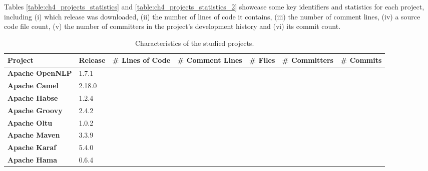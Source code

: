 Tables \ref{table:ch4_projects_statistics} and \ref{table:ch4_projects_statistics_2} showcase some key identifiers and statistics for each project, including (i) which release was downloaded, (ii) the number of lines of code it contains, (iii) the number of comment lines, (iv) a source code file count, (v) the number of committers in the project's development history and (vi) its commit count.

\begin{landscape}


\begin{table}[htbp]
	\small
	\centering
	\caption{Characteristics of the studied projects.}
	\begin{adjustbox}{width=1.3\textwidth}


		\begin{tabular}{l|l|l|c|c|c|c}
			\hline
			\textbf{Project}           & \textbf{Release} & \textbf{\# Lines of Code} & \textbf{\# Comment Lines} & \textbf{\# Files} & \textbf{\# Committers} & \textbf{\# Commits} \\ \hline
			\textbf{Apache OpenNLP}    & 1.7.1            &                           &                           &                   &                        &  \\ \hline
			\textbf{Apache Camel}      & 2.18.0           &                           &                           &                   &                        &  \\ \hline
			\textbf{Apache Habse}      & ‎1.2.4           &                           &                           &                   &                        &  \\ \hline
			\textbf{Apache Groovy}     & 2.4.2            &                           &                           &                   &                        &  \\ \hline
			\textbf{Apache Oltu}       & 1.0.2            &                           &                           &                   &                        &  \\ \hline
			\textbf{Apache Maven}      & 3.3.9            &                           &                           &                   &                        &  \\ \hline
			\textbf{Apache Karaf}      & 5.4.0            &                           &                           &                   &                        &  \\ \hline
			\textbf{Apache Hama}       & 0.6.4            &                           &                           &                   &                        &  \\ \hline

\end{tabular}
\end{adjustbox}
\end{table}
\end{landscape}

